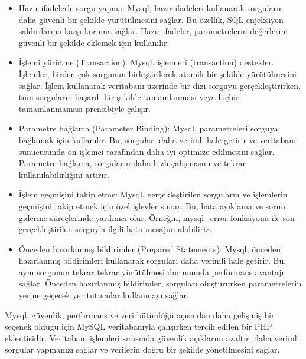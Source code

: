 \begin{itemize}
\item Hazır ifadelerle sorgu yapma: Mysql, hazır ifadeleri kullanarak sorguların daha güvenli bir şekilde yürütülmesini sağlar. Bu özellik, SQL enjeksiyon saldırılarına karşı koruma sağlar. Hazır ifadeler, parametrelerin değerlerini güvenli bir şekilde eklemek için kullanılır.

\item İşlemi yürütme (Transaction): Mysql, işlemleri (transaction) destekler. İşlemler, birden çok sorgunun birleştirilerek atomik bir şekilde yürütülmesini sağlar. İşlem kullanarak veritabanı üzerinde bir dizi sorguyu gerçekleştirirken, tüm sorguların başarılı bir şekilde tamamlanması veya hiçbiri tamamlanmaması prensibiyle çalışır.

\item Parametre bağlama (Parameter Binding): Mysql, parametreleri sorguya bağlamak için kullanılır. Bu, sorguları daha verimli hale getirir ve veritabanı sunucusunda ön işlemci tarafından daha iyi optimize edilmesini sağlar. Parametre bağlama, sorguların daha hızlı çalışmasını ve tekrar kullanılabilirliğini artırır.

\item İşlem geçmişini takip etme: Mysql, gerçekleştirilen sorguların ve işlemlerin geçmişini takip etmek için özel işlevler sunar. Bu, hata ayıklama ve sorun giderme süreçlerinde yardımcı olur. Örneğin, mysql\_error fonksiyonu ile son gerçekleştirilen sorguyla ilgili hata mesajını alabiliriz.

\item Önceden hazırlanmış bildirimler (Prepared Statements): Mysql, önceden hazırlanmış bildirimleri kullanarak sorguları daha verimli hale getirir. Bu, aynı sorgunun tekrar tekrar yürütülmesi durumunda performans avantajı sağlar. Önceden hazırlanmış bildirimler, sorguları oluştururken parametrelerin yerine geçecek yer tutucular kullanmayı sağlar.
\end{itemize}
Mysql, güvenlik, performans ve veri bütünlüğü açısından daha gelişmiş bir seçenek olduğu için MySQL veritabanıyla çalışırken tercih edilen bir PHP eklentisidir. Veritabanı işlemleri sırasında güvenlik açıklarını azaltır, daha verimli sorgular yapmanızı sağlar ve verilerin doğru bir şekilde yönetilmesini sağlar.


